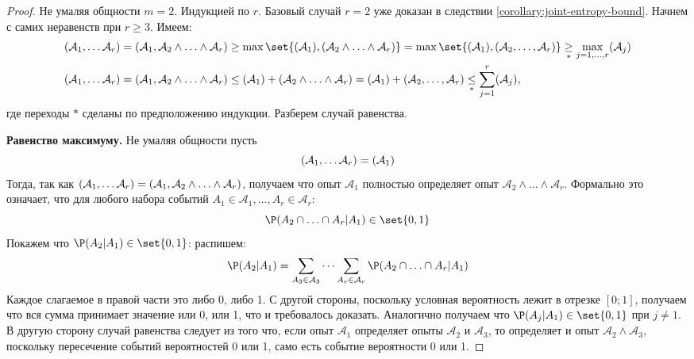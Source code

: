 \begin{proof}
	Не умаляя общности $m = 2$. Индукцией по $r$. Базовый случай $r = 2$ уже доказан в следствии  \ref{corollary:joint-entropy-bound}. Начнем с самих неравенств при $r \geq 3$. Имеем:
	\begin{align*}
		& \H(\mathcal{A}_1, \ldots \mathcal{A}_r)
			= \H(\mathcal{A}_1,  \mathcal{A}_2 \land \ldots \land \mathcal{A}_r) 
		 \geq \max\set{\H(\mathcal{A}_1), \H(\mathcal{A}_2 \land \ldots \land \mathcal{A}_r)}
		    = \max\set{\H(\mathcal{A}_1), \H(\mathcal{A}_2, \ldots, \mathcal{A}_r)}
		\underset{\ast}{\geq} \max_{j = 1,\ldots,r} \H(\mathcal{A}_j) \\
		& \H(\mathcal{A}_1, \ldots \mathcal{A}_r) 
			= \H(\mathcal{A}_1,  \mathcal{A}_2 \land \ldots \land \mathcal{A}_r) 
		 \leq \H(\mathcal{A}_1) + \H(\mathcal{A}_2 \land \ldots \land \mathcal{A}_r) 
	 	 	= \H(\mathcal{A}_1) + \H(\mathcal{A}_2, \ldots, \mathcal{A}_r) 
			\underset{\ast}{\leq} \sum_{j = 1}^{r}\H(\mathcal{A}_j),
	\end{align*}
	где переходы $\ast$ сделаны по предположению индукции. Разберем случай равенства.

	\noindent \textbf{Равенство максимуму.} Не умаляя общности пусть
	\[
	\relax(\mathcal{A}_1, \ldots \mathcal{A}_r) = \relax(\mathcal{A}_1)
	\]
	Тогда, так как \(\relax(\mathcal{A}_1, \ldots \mathcal{A}_r)= \relax(\mathcal{A}_1,  \mathcal{A}_2 \land \ldots \land \mathcal{A}_r)\),	получаем что опыт $\mathcal{A}_1$ полностью определяет опыт $\mathcal{A}_2 \land \ldots \land \mathcal{A}_r$. Формально это означает, что для любого набора событий $A_1 \in \mathcal{A}_1, \ldots, A_r \in \mathcal{A}_r$:
	\[
		\P(A_2 \cap \ldots \cap A_r | A_1) \in \set{0, 1}
	\]
	Покажем что $\P(A_2 | A_1) \in \set{0,1}$: распишем:
	\[
		\P(A_2 | A_1) = \sum_{A_3 \in \mathcal{A}_3} \cdots \sum_{A_r \in \mathcal{A}_r} \P(A_2 \cap \ldots \cap A_r | A_1) 
	\]
	Каждое слагаемое в правой части это либо 0, либо 1. С другой стороны, поскольку условная вероятность лежит в отрезке $[0; 1]$, получаем что вся сумма принимает значение или 0, или 1, что и требовалось доказать. Аналогично получаем что $\P(A_j | A_1) \in \set{0,1}$ при $j \neq 1$. В другую сторону случай равенства следует из того что, если опыт $\mathcal{A}_1$ определяет опыты $\mathcal{A}_2$ и $\mathcal{A}_3$, то определяет и опыт $\mathcal{A}_2 \land \mathcal{A}_3$, поскольку пересечение событий вероятностей 0 или 1, само есть событие вероятности 0 или 1.


\end{proof}

